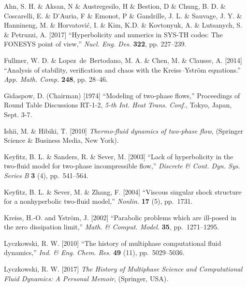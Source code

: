\documentclass{ws-ijbc}
\begin{document}
\begin{thebibliography}{9}

 Ahn, S. H. \& Aksan, N \& Austregesilo, H \& Bestion, D \& Chung, B. D. \& Coscarelli, E. \& D'Auria, F \& Emonot, P \& Gandrille, J. L. \& Sauvage, J. Y. \& Hannineng, M. \& Horvatovi{\'c}, I. \&  Kim, K.D. \& Kovtonyuk, A. \& Lutsanych, S. \& Petruzzi, A. [2017] ``Hyperbolicity and numerics in SYS-TH codes: The FONESYS point of view,'' {\it Nucl. Eng. Des.} {\bf 322}, pp. 227--239.

 Fullmer, W. D. \& Lopez~de~Bertodano, M. A. \& Chen, M. \& Clausse, A. [2014] ``Analysis of stability, verification and chaos with the Kreiss–Yström equations.'' {\it App. Math. Comp.} {\bf 248}, pp. 28--46.

 Gidaspow, D. {(Chairman)} [1974] ``Modeling of two-phase flows,'' Proceedings of Round Table Discussions {RT-1-2}, {\it 5-th Int. Heat Trans. Conf.}, Tokyo, Japan, Sept. 3-7.

 Ishii, M. \& Hibiki, T. [2010] {\it Thermo-fluid dynamics of two-phase flow}, (Springer Science \& Business Media, New York).

 Keyfitz, B. L. \& Sanders, R. \& Sever, M. [2003] ``Lack of hyperbolicity in the two-fluid model for two-phase incompressible flow,'' {\it Discrete \& Cont. Dyn. Sys. Series B} {\bf 3} (4), pp.~541--564.

 Keyfitz, B. L. \& Sever, M. \& Zhang, F. [2004] ``Viscous singular shock structure for a nonhyperbolic two-fluid model,'' {\it Nonlin.} {\bf 17} (5), pp.~1731.

 Kreiss, H.-O. and Ystr\"{o}m, J. [2002] ``Parabolic problems which are ill-posed in the zero dissipation limit,'' {\it Math. \& Comput. Model.} {\bf 35}, pp.~1271--1295.

 Lyczkowski, R. W. [2010] ``The history of multiphase computational fluid dynamics,'' {\it Ind. \& Eng. Chem. Res.} {\bf 49} (11), pp.~5029--5036.

 Lyczkowski, R. W. [2017] {\it The History of Multiphase Science and Computational Fluid Dynamics: A Personal Memoir}, (Springer, USA).


\end{thebibliography}
\end{document}

